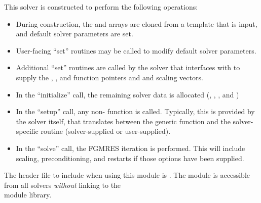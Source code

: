 This solver is constructed to perform the following operations:
\begin{itemize}
\item During construction, the  and  arrays are
  cloned from a template {\nvector} that is input, and default solver
  parameters are set.
\item User-facing ``set'' routines may be called to modify default
  solver parameters.
\item Additional ``set'' routines are called by the {\sundials} solver
  that interfaces with {\sunlinsolspfgmr} to supply the 
  , , and  function pointers and
   and  scaling vectors.
\item In the ``initialize'' call, the remaining solver data is
  allocated (, , , and  )
\item In the ``setup'' call, any non-
   function is called.  Typically, this is provided by
  the {\sundials} solver itself, that translates between the
  generic  function and the
  solver-specific routine (solver-supplied or user-supplied).
\item In the ``solve'' call, the FGMRES iteration is performed.  This
  will include scaling, preconditioning, and restarts if those options
  have been supplied.
\end{itemize}

\noindent The header file to include when using this module 
is . The {\sunlinsolspfgmr} module
is accessible from all {\sundials} solvers \textit{without}
linking to the \\
 module library. \\


